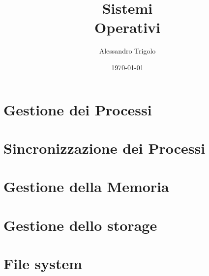 \documentclass[titlepage]{article}
\title{\textbf{\fontsize{35pt}{35pt}\selectfont Sistemi\\\vspace{25pt}Operativi}}
\author{Alessandro Trigolo}
\date{\today}
\begin{document}
\maketitle

\newpage\tableofcontents

\newpage\listoffigures

\newpage\lstlistoflistings


\lstset{style = C++}





\newpage\part{Gestione dei Processi}











\newpage\part{Sincronizzazione dei Processi}









\newpage\part{Gestione della Memoria}









\newpage\part{Gestione dello storage}









\newpage\part{File system}




\end{document}
